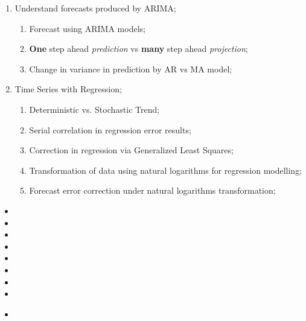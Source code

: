 \begin{outcomes}
\begin{enumerate}
\tcbline
	\item	Understand forecasts produced by ARIMA;
	\begin{knowledge}
	\begin{enumerate}
	\item	Forecast using ARIMA models;
	\item	\textbf{One} step ahead \textit{prediction} vs \textbf{many} step ahead \textit{projection};
	\item	Change in variance in prediction by AR vs MA model;
	\end{enumerate}
	\end{knowledge}
\tcbline
	\item	Time Series with Regression;
	\begin{knowledge}
	\begin{enumerate}
	\item	Deterministic vs. Stochastic Trend;
	\item	Serial correlation in regression error results;
	\item	Correction in regression via Generalized Least Squares;
	\item	Transformation of data using natural logarithms for regression modelling;
	\item	Forecast error correction under natural logarithms transformation;
	\end{enumerate}
	\end{knowledge}
\end{enumerate}
\end{outcomes}

\begin{ASM_chapter}
\begin{itemize}
	\item[]	
	\item[]	
	\item[]	
	\item[]	
	\item[]	
	\item[]	
	\item[]	
	\item[]	
\end{itemize}
\end{ASM_chapter}

\begin{YTB_vids}
\begin{itemize}
	\item	
\end{itemize}
\end{YTB_vids}

